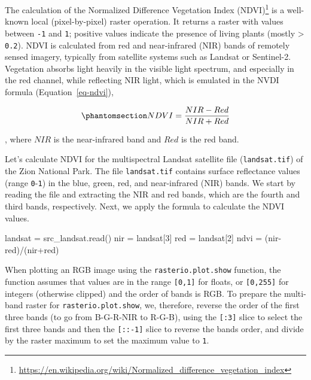 \documentclass[
  letterpaper,
]{krantz}
\newenvironment{Shaded}{\begin{snugshade}}{\end{snugshade}}
\newcommand{\DecValTok}[1]{\textcolor[rgb]{0.68,0.00,0.00}{#1}}
\newcommand{\NormalTok}[1]{\textcolor[rgb]{0.00,0.23,0.31}{#1}}
\newcommand{\OperatorTok}[1]{\textcolor[rgb]{0.37,0.37,0.37}{#1}}
\begin{document}
The calculation of the Normalized Difference Vegetation Index
(NDVI)\footnote{\url{https://en.wikipedia.org/wiki/Normalized_difference_vegetation_index}}
is a well-known local (pixel-by-pixel) raster operation. It returns a
raster with values between \texttt{-1} and \texttt{1}; positive values
indicate the presence of living plants (mostly \textgreater{}
\texttt{0.2}). NDVI is calculated from red and near-infrared (NIR) bands
of remotely sensed imagery, typically from satellite systems such as
Landsat or Sentinel-2. Vegetation absorbs light heavily in the visible
light spectrum, and especially in the red channel, while reflecting NIR
light, which is emulated in the NVDI formula (Equation~\ref{eq-ndvi}),

\begin{equation}\phantomsection\label{eq-ndvi}{
NDVI=\frac{NIR-Red} {NIR+Red}
}\end{equation}

, where \(NIR\) is the near-infrared band and \(Red\) is the red band.

Let's calculate NDVI for the multispectral Landsat satellite file
(\texttt{landsat.tif}) of the Zion National Park. The file
\texttt{landsat.tif} contains surface reflectance values (range
\texttt{0}-\texttt{1}) in the blue, green, red, and near-infrared (NIR)
bands. We start by reading the file and extracting the NIR and red
bands, which are the fourth and third bands, respectively. Next, we
apply the formula to calculate the NDVI values.

\begin{Shaded}
\begin{Highlighting}[]
\NormalTok{landsat }\OperatorTok{=}\NormalTok{ src\_landsat.read()}
\NormalTok{nir }\OperatorTok{=}\NormalTok{ landsat[}\DecValTok{3}\NormalTok{]}
\NormalTok{red }\OperatorTok{=}\NormalTok{ landsat[}\DecValTok{2}\NormalTok{]}
\NormalTok{ndvi }\OperatorTok{=}\NormalTok{ (nir}\OperatorTok{{-}}\NormalTok{red)}\OperatorTok{/}\NormalTok{(nir}\OperatorTok{+}\NormalTok{red)}
\end{Highlighting}
\end{Shaded}

When plotting an RGB image using the \texttt{rasterio.plot.show}
function, the function assumes that values are in the range
\texttt{{[}0,1{]}} for floats, or \texttt{{[}0,255{]}} for integers
(otherwise clipped) and the order of bands is RGB. To prepare the
multi-band raster for \texttt{rasterio.plot.show}, we, therefore,
reverse the order of the first three bands (to go from B-G-R-NIR to
R-G-B), using the \texttt{{[}:3{]}} slice to select the first three
bands and then the \texttt{{[}::-1{]}} slice to reverse the bands order,
and divide by the raster maximum to set the maximum value to \texttt{1}.
\end{document}
